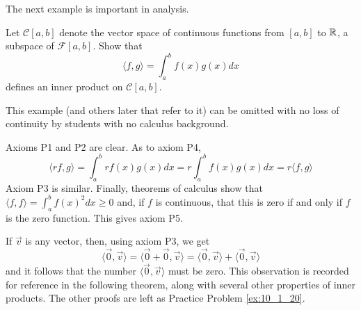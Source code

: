 \documentclass{ximera}
\begin{document}
The next example is important in analysis.

\begin{example}\label{exa:030334}
Let $\mathcal{C}[a, b]$ denote the vector space of
continuous functions from $[a, b]$ to $\mathbb{R}$, a subspace of $\mathcal{F}[a, b]$. Show that
\begin{equation*}
\langle f, g \rangle = \int_{a}^{b} f(x)g(x)dx
\end{equation*}
defines an inner product on $\mathcal{C}[a, b]$.

\begin{remark}
    This example (and others later that refer to it) can be omitted with no loss of continuity by students with no calculus background.
\end{remark}

\begin{explanation}
Axioms P1 and P2 are clear. As to axiom P4,
\begin{equation*}
\langle rf, g \rangle = \int_{a}^{b} rf(x)g(x)dx = r\int_{a}^{b} f(x)g(x)dx =
r\langle f, g \rangle
\end{equation*}
Axiom P3 is similar. Finally, theorems of calculus show that $\langle f, f \rangle = \int_{a}^{b} f(x)^2dx \geq 0$ and, if $f$ is continuous, that this is zero if and only if $f$ is the zero function. This gives axiom P5.
\end{explanation}
\end{example}


If $\vec{v}$ is any vector, then, using axiom P3, we get
\begin{equation*}
\langle \vec{0}, \vec{v} \rangle = \langle \vec{0} + \vec{0}, \vec{v} \rangle =
\langle \vec{0}, \vec{v} \rangle + \langle \vec{0}, \vec{v} \rangle
\end{equation*}
and it follows that the number $\langle\vec{0}, \vec{v}\rangle$ must be zero. This observation is recorded for reference in the following theorem, along with several other properties of inner products. The other proofs are left as Practice Problem \ref{ex:10_1_20}.
\end{document}
